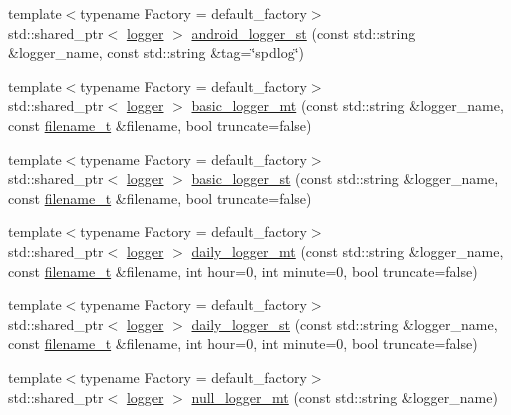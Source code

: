 \begin{DoxyCompactItemize}
\item 
{\footnotesize template$<$typename Factory  = default\+\_\+factory$>$ }\\std\+::shared\+\_\+ptr$<$ \hyperlink{classspdlog_1_1logger}{logger} $>$ \hyperlink{namespacespdlog_aab5b508d51de238919a570cf3ca6d3db}{android\+\_\+logger\+\_\+st} (const std\+::string \&logger\+\_\+name, const std\+::string \&tag=\char`\"{}spdlog\char`\"{})
\item 
{\footnotesize template$<$typename Factory  = default\+\_\+factory$>$ }\\std\+::shared\+\_\+ptr$<$ \hyperlink{classspdlog_1_1logger}{logger} $>$ \hyperlink{namespacespdlog_abd73a6177edaccb77048bf47e3f8ad23}{basic\+\_\+logger\+\_\+mt} (const std\+::string \&logger\+\_\+name, const \hyperlink{namespacespdlog_acf7ce125b3622e44f8f1702d699e0b06}{filename\+\_\+t} \&filename, bool truncate=false)
\item 
{\footnotesize template$<$typename Factory  = default\+\_\+factory$>$ }\\std\+::shared\+\_\+ptr$<$ \hyperlink{classspdlog_1_1logger}{logger} $>$ \hyperlink{namespacespdlog_abc9cd0646191cc0b295b6e50367b22b7}{basic\+\_\+logger\+\_\+st} (const std\+::string \&logger\+\_\+name, const \hyperlink{namespacespdlog_acf7ce125b3622e44f8f1702d699e0b06}{filename\+\_\+t} \&filename, bool truncate=false)
\item 
{\footnotesize template$<$typename Factory  = default\+\_\+factory$>$ }\\std\+::shared\+\_\+ptr$<$ \hyperlink{classspdlog_1_1logger}{logger} $>$ \hyperlink{namespacespdlog_aeab720351e32788bc6cdf8ada42b0f1f}{daily\+\_\+logger\+\_\+mt} (const std\+::string \&logger\+\_\+name, const \hyperlink{namespacespdlog_acf7ce125b3622e44f8f1702d699e0b06}{filename\+\_\+t} \&filename, int hour=0, int minute=0, bool truncate=false)
\item 
{\footnotesize template$<$typename Factory  = default\+\_\+factory$>$ }\\std\+::shared\+\_\+ptr$<$ \hyperlink{classspdlog_1_1logger}{logger} $>$ \hyperlink{namespacespdlog_a887beb44c55ef32f4bc62fa16451c77e}{daily\+\_\+logger\+\_\+st} (const std\+::string \&logger\+\_\+name, const \hyperlink{namespacespdlog_acf7ce125b3622e44f8f1702d699e0b06}{filename\+\_\+t} \&filename, int hour=0, int minute=0, bool truncate=false)
\item 
{\footnotesize template$<$typename Factory  = default\+\_\+factory$>$ }\\std\+::shared\+\_\+ptr$<$ \hyperlink{classspdlog_1_1logger}{logger} $>$ \hyperlink{namespacespdlog_a6d6344c349d1c6d957d5f21f4387c8f8}{null\+\_\+logger\+\_\+mt} (const std\+::string \&logger\+\_\+name)

\end{DoxyCompactItemize}
